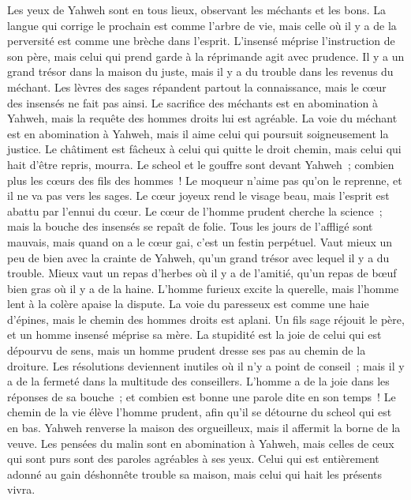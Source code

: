 \begin{multicols}{2}
Les yeux de Yahweh sont en tous lieux, observant les méchants et les bons.
La langue qui corrige le prochain est comme l'arbre de vie, mais celle où il y a de la perversité est comme une brèche dans l'esprit.
L'insensé méprise l'instruction de son père, mais celui qui prend garde à la réprimande agit avec prudence.
Il y a un grand trésor dans la maison du juste, mais il y a du trouble dans les revenus du méchant.
Les lèvres des sages répandent partout la connaissance, mais le cœur des insensés ne fait pas ainsi.
Le sacrifice des méchants est en abomination à Yahweh, mais la requête des hommes droits lui est agréable.
La voie du méchant est en abomination à Yahweh, mais il aime celui qui poursuit soigneusement la justice.
Le châtiment est fâcheux à celui qui quitte le droit chemin, mais celui qui hait d'être repris, mourra.
Le scheol et le gouffre sont devant Yahweh~; combien plus les cœurs des fils des hommes~!
Le moqueur n'aime pas qu'on le reprenne, et il ne va pas vers les sages.
Le cœur joyeux rend le visage beau, mais l'esprit est abattu par l'ennui du cœur.
Le cœur de l'homme prudent cherche la science~; mais la bouche des insensés se repaît de folie.
Tous les jours de l'affligé sont mauvais, mais quand on a le cœur gai, c'est un festin perpétuel.
Vaut mieux un peu de bien avec la crainte de Yahweh, qu'un grand trésor avec lequel il y a du trouble.
Mieux vaut un repas d'herbes où il y a de l'amitié, qu'un repas de bœuf bien gras où il y a de la haine.
L'homme furieux excite la querelle, mais l'homme lent à la colère apaise la dispute.
La voie du paresseux est comme une haie d'épines, mais le chemin des hommes droits est aplani.
Un fils sage réjouit le père, et un homme insensé méprise sa mère.
La stupidité est la joie de celui qui est dépourvu de sens, mais un homme prudent dresse ses pas au chemin de la droiture.
 Les résolutions deviennent inutiles où il n'y a point de conseil~; mais il y a de la fermeté dans la multitude des conseillers.
L'homme a de la joie dans les réponses de sa bouche~; et combien est bonne une parole dite en son temps~!
Le chemin de la vie élève l'homme prudent, afin qu'il se détourne du scheol qui est en bas.
Yahweh renverse la maison des orgueilleux, mais il affermit la borne de la veuve.
Les pensées du malin sont en abomination à Yahweh, mais celles de ceux qui sont purs sont des paroles agréables à ses yeux.
Celui qui est entièrement adonné au gain déshonnête trouble sa maison, mais celui qui hait les présents vivra.

\end{multicols}
